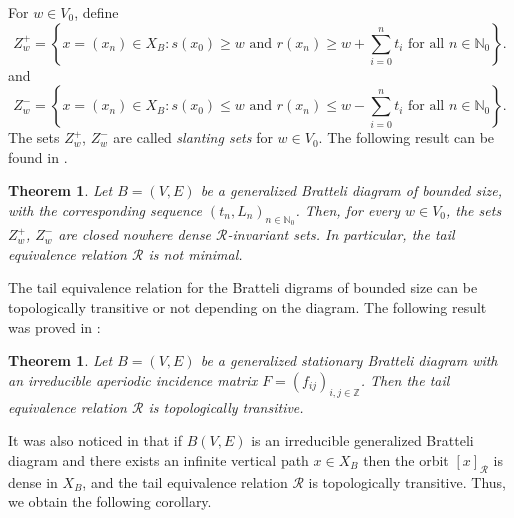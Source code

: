 \documentclass[11pt, twoside]{amsart}
\theoremstyle{definition}
\theoremstyle{remark}
\theoremstyle{plain}
\newtheorem{theorem}[definition]{Theorem}
\newcommand{\tcr}{\textcolor{red}}
\newcommand{\N}{\mathbb N}
\numberwithin{equation}{section}
\begin{document}
For $w \in V_0$, define 
$$
Z_w^+ = \left\{x = (x_n) \in X_B : s(x_0) \geq w \mbox{ and } 
r(x_n) \geq w + \sum_{i = 0}^{n} t_i \mbox{ for all } n \in 
\mathbb{N}_0\right\}.
$$
and
$$
Z_w^- = \left\{x = (x_n) \in X_B : s(x_0) \leq w \mbox{ and } 
r(x_n) \leq w - \sum_{i = 0}^{n} t_i \mbox{ for all } n \in 
\mathbb{N}_0\right\}.
$$
The sets $Z^+_w$, $Z^-_w$ are called \textit{slanting sets} for 
$w \in V_0$. 
The following result can be found in \cite[Lemma 5.3, Theorem 5.4]{BezuglyiJorgensenKarpelSanadhya2025}.



\begin{theorem}\cite{BezuglyiJorgensenKarpelKwiatkowski2025}
    Let $B = (V,E) $ be a generalized Bratteli diagram of bounded size, with the 
corresponding sequence $(t_n, L_n)_{n \in \N_0}$. 
Then, for every $w \in V_0$, the sets $Z^+_w$, $Z^-_w$ are closed 
nowhere dense $\mathcal{R}$-invariant sets. In particular,  the tail equivalence relation 
$\mathcal{R}$ is \textit{not minimal}.
\end{theorem}

The tail equivalence relation for the Bratteli digrams of bounded size can be topologically transitive or not depending on the diagram. The following result was proved in \cite[Theorem 5.1]{BezuglyiJorgensenKarpelSanadhya2025}:

\begin{theorem}\label{ThmBJKStoptrans}\cite{BezuglyiJorgensenKarpelSanadhya2025}
 Let $B = (V,  E)$ be a generalized stationary Bratteli diagram 
with an 
irreducible aperiodic incidence matrix $F = (f_{ij})_{i,j \in 
\mathbb{Z}}$. Then the tail equivalence relation $\mathcal{R}$ is 
topologically transitive.   
\end{theorem}

It was also noticed in \cite[Remark 5.2]{BezuglyiJorgensenKarpelSanadhya2025} that if $B(V, E)$ is an irreducible generalized Bratteli diagram and
there exists an infinite vertical path $x \in X_B$ 
then the orbit $[x]_{\mathcal R}$ is dense in $X_B$, and 
the tail equivalence relation $\mathcal{R}$ is topologically 
transitive. Thus, we obtain the following corollary.
\end{document}
